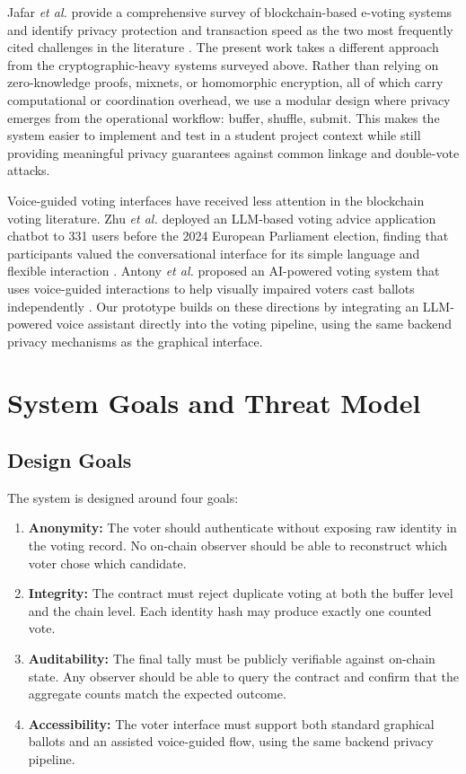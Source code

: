 \documentclass{ieeeaccess}
\begin{document}
Jafar \emph{et al.} provide a comprehensive survey of blockchain-based e-voting systems and identify privacy protection and transaction speed as the two most frequently cited challenges in the literature \cite{Jafar2021}. The present work takes a different approach from the cryptographic-heavy systems surveyed above. Rather than relying on zero-knowledge proofs, mixnets, or homomorphic encryption, all of which carry computational or coordination overhead, we use a modular design where privacy emerges from the operational workflow: buffer, shuffle, submit. This makes the system easier to implement and test in a student project context while still providing meaningful privacy guarantees against common linkage and double-vote attacks.

Voice-guided voting interfaces have received less attention in the blockchain voting literature. Zhu \emph{et al.} deployed an LLM-based voting advice application chatbot to 331 users before the 2024 European Parliament election, finding that participants valued the conversational interface for its simple language and flexible interaction \cite{Zhu2025}. Antony \emph{et al.} proposed an AI-powered voting system that uses voice-guided interactions to help visually impaired voters cast ballots independently \cite{Antony2025}. Our prototype builds on these directions by integrating an LLM-powered voice assistant directly into the voting pipeline, using the same backend privacy mechanisms as the graphical interface.

\section{System Goals and Threat Model}
\subsection{Design Goals}
The system is designed around four goals:
\begin{enumerate}
    \item \textbf{Anonymity:} The voter should authenticate without exposing raw identity in the voting record. No on-chain observer should be able to reconstruct which voter chose which candidate.
    \item \textbf{Integrity:} The contract must reject duplicate voting at both the buffer level and the chain level. Each identity hash may produce exactly one counted vote.
    \item \textbf{Auditability:} The final tally must be publicly verifiable against on-chain state. Any observer should be able to query the contract and confirm that the aggregate counts match the expected outcome.
    \item \textbf{Accessibility:} The voter interface must support both standard graphical ballots and an assisted voice-guided flow, using the same backend privacy pipeline.
\end{enumerate}
\end{document}
